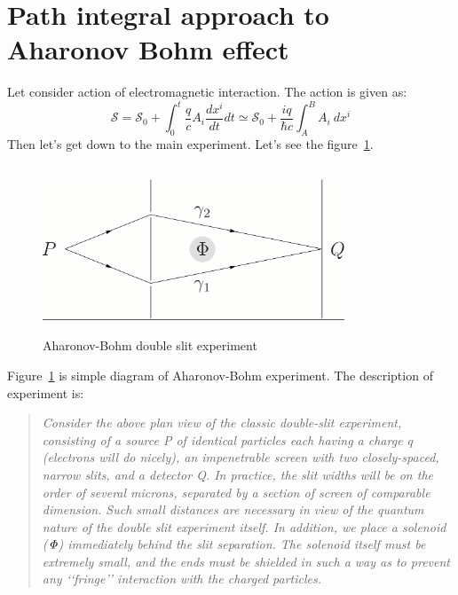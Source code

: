 \documentclass[%
 reprint,
 amsmath,amssymb,
 aps,
]{revtex4-1}
\begin{document}
\section{\label{sec:level3}Path integral approach to Aharonov Bohm effect}

Let consider action of electromagnetic interaction. The action is given as:
\begin{equation}
\mathcal{S}=\mathcal{S}_0 + \int_{0}^{t} \frac{q}{c}A_i\frac{dx^i}{dt}dt \simeq \mathcal{S}_0 + \frac{iq}{\hbar c}\int_{A}^{B} A_i\ dx^i
\end{equation}
Then let's get down to the main experiment. Let's see the figure~\ref{fig:1}.
\begin{figure}[h!]
    \centering
    \includegraphics[width=9cm, height=5cm]{AB.png}
    \caption{Aharonov-Bohm double slit experiment}
    \label{fig:1}
\end{figure}

Figure~\ref{fig:1} is simple diagram of Aharonov-Bohm experiment. The description of experiment is: \cite{experiment}
\begin{quote}
\textit{Consider the above plan view of the classic double-slit experiment, consisting of a source P of identical particles
each having a charge q (electrons will do nicely), an impenetrable screen with two closely-spaced, narrow slits,
and a detector Q. In practice, the slit widths will be on the order of several microns, separated by a section of
screen of comparable dimension. Such small distances are necessary in view of the quantum nature of the double
slit experiment itself. In addition, we place a solenoid ($\it\Phi$) immediately behind the slit separation. The solenoid
itself must be extremely small, and the ends must be shielded in such a way as to prevent any ‘‘fringe’’ interaction
with the charged particles.}
\end{quote}
\end{document}
